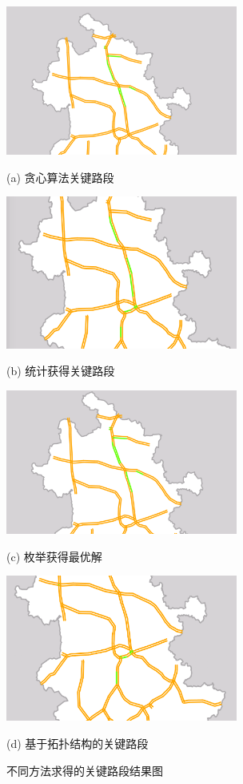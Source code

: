 				\begin{figure}
				\begin{minipage}{0.48\linewidth}
				  \centerline{\includegraphics[width=3.0in]{picture/tanxin}}
				  \centerline{(a) 贪心算法关键路段}
				\end{minipage}
				\hfill
				\begin{minipage}{.48\linewidth}
				  \centerline{\includegraphics[width=3.0in]{picture/hotsection}}
				  \centerline{(b) 统计获得关键路段}
				\end{minipage}
				\vfill
				\begin{minipage}{0.48\linewidth}
				  \centerline{\includegraphics[width=3.0in]{picture/meiju}}
				  \centerline{(c) 枚举获得最优解}
				\end{minipage}
				\hfill
				\begin{minipage}{0.48\linewidth}
				  \centerline{\includegraphics[width=3.0in]{picture/degree}}
				  \centerline{(d) 基于拓扑结构的关键路段}
				\end{minipage}
				\caption{不同方法求得的关键路段结果图}
				\label{fig2}
				\end{figure}


